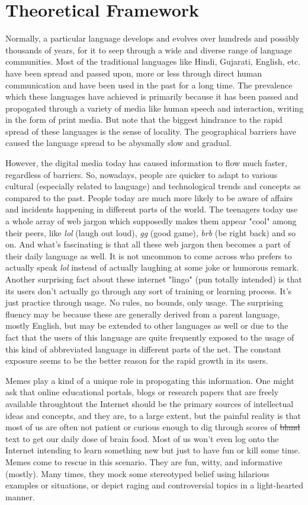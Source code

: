 \documentclass{article}
\begin{document}
\section{Theoretical Framework}
Normally, a particular language develops and evolves over hundreds and possibly thousands of years, for it to seep through a wide and diverse range of language communities. Most of the traditional languages like Hindi, Gujarati, English, etc. have been spread and passed upon, more or less through direct human communication and have been used in the past for a long time.  The prevalence which these languages have achieved is primarily because it has been passed and propogated through a variety of media like human speech and interaction, writing in the form of print media. But note that the biggest hindrance to the rapid spread of these languages is the sense of locality. The geographical barriers have caused the language spread to be abysmally slow and gradual.

However, the digital media today has caused information to flow much faster, regardless of barriers. So, nowadays, people are quicker to adapt to various cultural (especially related to language) and technological trends and concepts as compared to the past. People today are much more likely to be aware of affairs and incidents happening in different parts of the world. The teenagers today use a whole array of web jargon which supposedly makes them appear "cool" among their peers, like \textit{lol} (laugh out loud), \textit{gg} (good game), \textit{brb} (be right back) and so on. And what's fascinating is that all these web jargon then becomes a part of their daily language as well. It is not uncommon to come across who prefers to actually speak \textit{lol} instead of actually laughing at some joke or humorous remark. Another surprising fact about these internet "lingo" (pun totally intended) is that its users don't actually go through any sort of training or learning process. It's just practice through usage. No rules, no bounds, only usage. The surprising fluency may be because these are generally derived from a parent language, mostly English, but may be extended to other languages as well or due to the fact that the users of this language are quite frequently exposed to the usage of this kind of abbreviated language in different parts of the net. The constant exposure seems to be the better reason for the rapid growth in its users. 
    
Memes play a kind of a unique role in propogating this information. One might ask that online educational portals, blogs or research papers that are freely available throughtout the Internet should be the primary sources of intellectual ideas and concepts, and they are, to a large extent, but the painful reality is that most of us are often not patient or curious enough to dig through scores of \st{bland} text to get our daily dose of brain food. Most of us won't even log onto the Internet intending to learn something new but just to have fun or kill some time. Memes come to rescue in this scenario. They are fun, witty, and informative (mostly). Many times, they mock some stereotyped belief using hilarious examples or situations, or depict raging and controversial topics in a light-hearted manner. 
\end{document}
